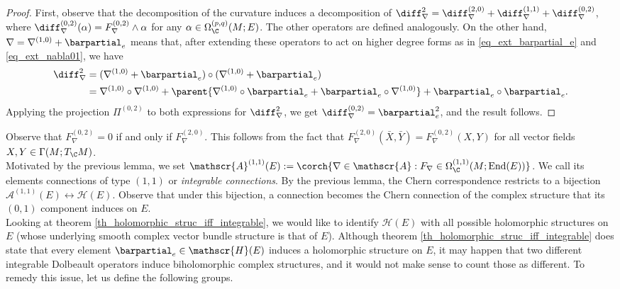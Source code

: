  \begin{proof}
    First, observe that the decomposition of the curvature induces a decomposition of \(\diff_\nabla^2=\diff_\nabla^{(2,0)}+\diff_\nabla^{(1,1)}+\diff_\nabla^{(0,2)}\), where \(\diff_\nabla^{(0,2)}(\alpha)=F_\nabla^{(0,2)}\wedge \alpha\) for any \(\alpha \in \Omega_\C^{(p,q)}(M;E)\). The other operators are defined analogously. On the other hand, \(\nabla=\nabla^{(1,0)}+\barpartial_e\) means that, after extending these operators to act on higher degree forms as in \eqref{eq_ext_barpartial_e} and \eqref{eq_ext_nabla01}, we have
    \begin{align*}
    \diff_\nabla^2&=(\nabla^{(1,0)}+\barpartial_e) \circ (\nabla^{(1,0)}+\barpartial_e)\\
    &=\nabla^{(1,0)}\circ \nabla^{(1,0)} + \parent{\nabla^{(1,0)}\circ \barpartial_e+\barpartial_e\circ \nabla^{(1,0)}} + \barpartial_e \circ \barpartial_e. 
    \end{align*}
    Applying the projection \(\Pi^{(0,2)}\) to both expressions for \(\diff_\nabla^2\), we get \(\diff_\nabla^{(0,2)}=\barpartial_e^2\), and the result follows.
 \end{proof}
Observe that \(F_\nabla^{(0,2)}=0\) if and only if \(F_\nabla^{(2,0)}\). This follows from the fact that \(F_\nabla^{(2,0)}(\bar{X}, \bar{Y})=F_\nabla^{(0,2)}(X,Y)\) for all vector fields \(X, Y \in \Gamma(M; T_\C M)\). \\

Motivated by the previous lemma, we set \(\mathscr{A}^{(1,1)}(E):=\corch{\nabla \in \mathscr{A}: F_\nabla \in \Omega_\C^{(1,1)}(M; \mathrm{End}(E))}\). We call its elements connections of type \((1,1)\) or \textit{integrable connections}. By the previous lemma, the Chern correspondence restricts to a bijection \(\mathscr{A}^{(1,1)}(E) \leftrightarrow \mathscr{H}(E)\). Observe that under this bijection, a connection becomes the Chern connection of the complex structure that its \((0,1)\) component induces on \(E\). \\

Looking at theorem \ref{th_holomorphic_struc_iff_integrable}, we would like to identify \(\mathscr{H}(E)\) with all possible holomorphic structures on \(E\) (whose underlying smooth complex vector bundle structure is that of \(E\)). Although theorem \ref{th_holomorphic_struc_iff_integrable} does state that every element \(\barpartial_e \in \mathscr{H}(E)\) induces a holomorphic structure on \(E\), it may happen that two different integrable Dolbeault operators induce biholomorphic complex structures, and it would not make sense to count those as different. To remedy this issue, let us define the following groups.

